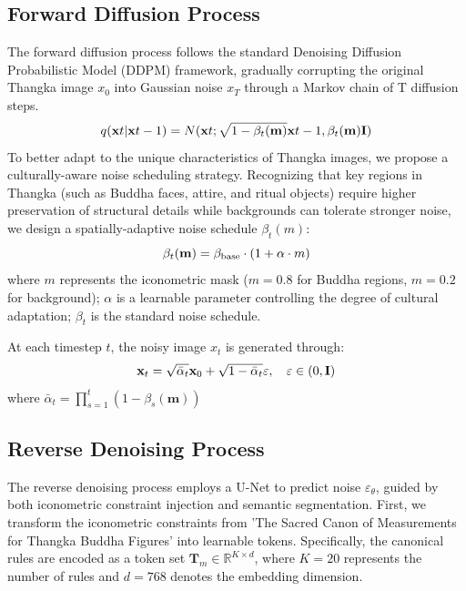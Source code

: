 \documentclass[sn-mathphys]{sn-jnl}%
\theoremstyle{thmstyleone}%
\theoremstyle{thmstyletwo}%
\theoremstyle{thmstylethree}%
\begin{document}
\subsection{Forward Diffusion Process}
The forward diffusion process follows the standard Denoising Diffusion Probabilistic Model (DDPM) \cite{b31} framework, gradually corrupting the original Thangka image $ x_0 $ into Gaussian noise $ x_T $ through a Markov chain of T diffusion steps.
\begin{equation}
	q({\bf{x}}t \vert {\bf{x}}t - 1) = N({\bf{x}}t;\sqrt {1 - {\beta _t}({\bf{m}})} {\bf{x}}t - 1,{\beta _t}({\bf{m}}){\bf{I}})
	\label{eq1}
\end{equation}
To better adapt to the unique characteristics of Thangka images, we propose a culturally-aware noise scheduling strategy. Recognizing that key regions in Thangka (such as Buddha faces, attire, and ritual objects) require higher preservation of structural details while backgrounds can tolerate stronger noise, we design a spatially-adaptive noise schedule $ {\beta _t}(m) $:
\begin{equation}
	{\beta _t}({\bf{m}}) = {\beta _{{\rm{base}}}} \cdot \left( {1 + \alpha  \cdot m} \right)
	\label{eq2}
\end{equation}
where $ m $ represents the iconometric mask ($ m=0.8 $ for Buddha regions, $ m=0.2 $ for background); $ \alpha $ is a learnable parameter controlling the degree of cultural adaptation; $ {\beta _t} $ is the standard noise schedule.

At each timestep $ t $, the noisy image $ {x_t} $ is generated through:
\begin{equation}
	{{\bf{x}}_t} = \sqrt {{{\bar \alpha }_t}} {{\bf{x}}_0} + \sqrt {1 - {{\bar \alpha }_t}} \varepsilon ,\;\;\;{\kern 1pt} \varepsilon  \in (0,{\bf{I}}) 
	\label{eq3}
\end{equation}
where $\bar{\alpha}_t=\prod_{s=1}^t(1-\beta_s(\mathbf{m}))$
\subsection{Reverse Denoising Process}
The reverse denoising process employs a U-Net to predict noise $ {\varepsilon _\theta } $, guided by both iconometric constraint injection and semantic segmentation. First, we transform the iconometric constraints from 'The Sacred Canon of Measurements for Thangka Buddha Figures' into learnable tokens. Specifically, the canonical rules are encoded as a token set $\mathbf{T}_m\in\mathbb{R}^{K\times d}$, where $ K=20 $ represents the number of rules and $ d=768 $ denotes the embedding dimension.
\end{document}
